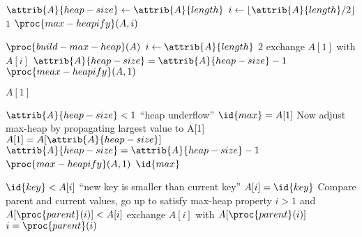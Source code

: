 \documentclass[12pt]{article}
\begin{document}
\begin{codebox}
\li $\attrib{A}{heap-size} \gets \attrib{A}{length}$ 
\li \For $i \gets \lfloor \attrib{A}{length}/2 \rfloor$ \Downto $1$
\li \Do
        $\proc{max-heapify}(A, i)$
    \End
\end{codebox}

\begin{codebox}
\li $\proc{build-max-heap}(A)$
\li \For $i \gets \attrib{A}{length}$ \Downto $2$
\li \Do
        exchange $A[1]$ with $A[i]$
\li     $\attrib{A}{heap-size} = \attrib{A}{heap-size} - 1$
\li     $\proc{meax-heapify}(A, 1)$
    \End
\end{codebox}

\begin{codebox}
\li \Return $A[1]$
\end{codebox}

\begin{codebox}
\li \If $\attrib{A}{heap-size} < 1$
\li \Then
        \Error ``heap underflow''
    \End
\li $\id{max} = A[1]$
\li \Comment Now adjust max-heap by propagating largest value to A[1]
\li $A[1] = A[\attrib{A}{heap-size}]$
\li $\attrib{A}{heap-size} = \attrib{A}{heap-size} - 1$
\li $\proc{max-heapify}(A, 1)$
\li \Return $\id{max}$
\end{codebox}

\begin{codebox}
\li \If $\id{key} < A[i]$
\li \Then
        \Error ``new key is smaller than current key''
    \End
\li $A[i] = \id{key}$
\li \Comment Compare parent and current values, go up to satisfy max-heap property
\li \While $i >  1$ and $A[\proc{parent}(i)] < A[i]$
\li \Do
        exchange $A[i]$ with $A[\proc{parent}(i)]$
\li     $i = \proc{parent}(i)$
    \End
\end{codebox}
\end{document}
